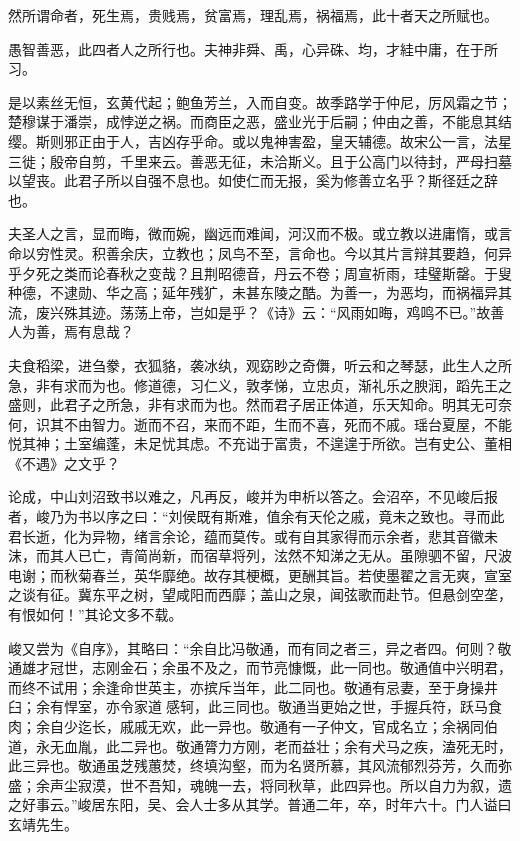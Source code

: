 \documentclass[12pt,UTF8]{ctexbook}
\begin{document}
然所谓命者，死生焉，贵贱焉，贫富焉，理乱焉，祸福焉，此十者天之所赋也。

愚智善恶，此四者人之所行也。夫神非舜、禹，心异硃、均，才絓中庸，在于所习。

是以素丝无恒，玄黄代起；鲍鱼芳兰，入而自变。故季路学于仲尼，厉风霜之节；楚穆谋于潘崇，成悖逆之祸。而商臣之恶，盛业光于后嗣；仲由之善，不能息其结缨。斯则邪正由于人，吉凶存乎命。或以鬼神害盈，皇天辅德。故宋公一言，法星三徙；殷帝自剪，千里来云。善恶无征，未洽斯义。且于公高门以待封，严母扫墓以望丧。此君子所以自强不息也。如使仁而无报，奚为修善立名乎？斯径廷之辞也。

夫圣人之言，显而晦，微而婉，幽远而难闻，河汉而不极。或立教以进庸惰，或言命以穷性灵。积善余庆，立教也；凤鸟不至，言命也。今以其片言辩其要趋，何异乎夕死之类而论春秋之变哉？且荆昭德音，丹云不卷；周宣祈雨，珪璧斯罄。于叟种德，不逮勋、华之高；延年残犷，未甚东陵之酷。为善一，为恶均，而祸福异其流，废兴殊其迹。荡荡上帝，岂如是乎？《诗》云：“风雨如晦，鸡鸣不已。”故善人为善，焉有息哉？

夫食稻梁，进刍豢，衣狐貉，袭冰纨，观窈眇之奇儛，听云和之琴瑟，此生人之所急，非有求而为也。修道德，习仁义，敦孝悌，立忠贞，渐礼乐之腴润，蹈先王之盛则，此君子之所急，非有求而为也。然而君子居正体道，乐天知命。明其无可奈何，识其不由智力。逝而不召，来而不距，生而不喜，死而不戚。瑶台夏屋，不能悦其神；土室编蓬，未足忧其虑。不充诎于富贵，不遑遑于所欲。岂有史公、董相《不遇》之文乎？

论成，中山刘沼致书以难之，凡再反，峻并为申析以答之。会沼卒，不见峻后报者，峻乃为书以序之曰：“刘侯既有斯难，值余有天伦之戚，竟未之致也。寻而此君长逝，化为异物，绪言余论，蕴而莫传。或有自其家得而示余者，悲其音徽未沫，而其人已亡，青简尚新，而宿草将列，泫然不知涕之无从。虽隙驷不留，尺波电谢；而秋菊春兰，英华靡绝。故存其梗概，更酬其旨。若使墨翟之言无爽，宣室之谈有征。冀东平之树，望咸阳而西靡；盖山之泉，闻弦歌而赴节。但悬剑空垄，有恨如何！”其论文多不载。

峻又尝为《自序》，其略曰：“余自比冯敬通，而有同之者三，异之者四。何则？敬通雄才冠世，志刚金石；余虽不及之，而节亮慷慨，此一同也。敬通值中兴明君，而终不试用；余逢命世英主，亦摈斥当年，此二同也。敬通有忌妻，至于身操井臼；余有悍室，亦令家道感轲，此三同也。敬通当更始之世，手握兵符，跃马食肉；余自少迄长，戚戚无欢，此一异也。敬通有一子仲文，官成名立；余祸同伯道，永无血胤，此二异也。敬通膂力方刚，老而益壮；余有犬马之疾，溘死无时，此三异也。敬通虽芝残蕙焚，终填沟壑，而为名贤所慕，其风流郁烈芬芳，久而弥盛；余声尘寂漠，世不吾知，魂魄一去，将同秋草，此四异也。所以自力为叙，遗之好事云。”峻居东阳，吴、会人士多从其学。普通二年，卒，时年六十。门人谥曰玄靖先生。
\end{document}
